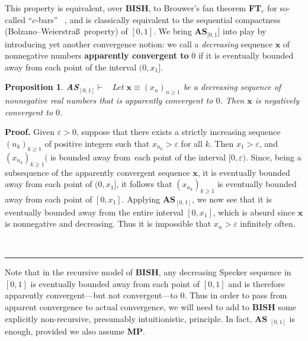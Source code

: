 \documentclass[11pt]{article}%
\newtheorem{proposition}[theorem]{Proposition}
\newenvironment{proof}[1][Proof]{\noindent\textbf{#1.} }{\ \rule{0.5em}{0.5em}}
\begin{document}
\noindent
This property is equivalent, over \textbf{BISH}, to Brouwer's fan theorem
\textbf{FT}$_{c}$ for so-called \textquotedblleft$c$-bars\textquotedblright%
\ \cite{BBerg}, and is classically equivalent to the sequential compactness
(Bolzano--Weierstra\ss \ property) of $\left[  0,1\right]  $. We bring
\textbf{AS}$_{[0,1}]$ into play by introducing yet another convergence notion:
we call a \emph{decreasing} sequence $\mathbf{x}$ of nonnegative numbers
\textbf{apparently convergent to} $0$ if it is eventually bounded away from
each point of the interval $(0,x_{1}]$.

\begin{proposition}
\label{1207a1}\emph{\textbf{AS}}$_{\left[  0,1\right]  }\vdash$ \ Let
$\mathbf{x}\equiv\left(  x_{n}\right)  _{n\geqslant1}$ be a decreasing
sequence of nonnegative real numbers that is apparently convergent to $0$.
Then $\mathbf{x}$ is negatively convergent to $0$.
\end{proposition}

\begin{proof}
Given $\varepsilon>0$, suppose that there exists a strictly increasing
sequence $\left(  n_{k}\right)  _{k\geqslant1}$ of positive integers such that
$x_{n_{k}}>\varepsilon$ for all $k$. Then $x_{1}>\varepsilon$, and $\left(
x_{n_{k}}\right)  _{k\geq1}($ is bounded away from\ each point of the interval
$[0,\varepsilon)$. Since, being a subsequence of the apparently convergent
sequence $\mathbf{x}$, it is eventually bounded away from each point of
$(0,x_{1}]$, it follows that $\left(  x_{n_{k}}\right)  _{k\geqslant1}$ is
eventually bounded away from each point of $\left[  0,x_{1}\right]  $.
Applying \textbf{AS}$_{[0,1]}$, we now see that it is eventually bounded away
from the entire interval $\left[  0,x_{1}\right]  $, which is absurd since
$\mathbf{x}$ is nonnegative and decreasing. Thus it is impossible that
$x_{n}>\varepsilon$ infinitely often.%

\hfill

\end{proof}%

\bigskip


Note that in the recursive model of \textbf{BISH}, any decreasing Specker
sequence in $\left[  0,1\right]  $ is eventually bounded away from each point
of $\left[  0,1\right]  $ and is therefore apparently convergent---but not
convergent---to $0$. Thus in order to pass from apparent convergence to actual
convergence, we will need to add to \textbf{BISH }some explicitly
non-recursive, presumably intuitionistic, principle. In fact, \textbf{AS}%
$_{\left[  0,1\right]  }$ is enough, provided we also assume \textbf{MP}.
\end{document}
